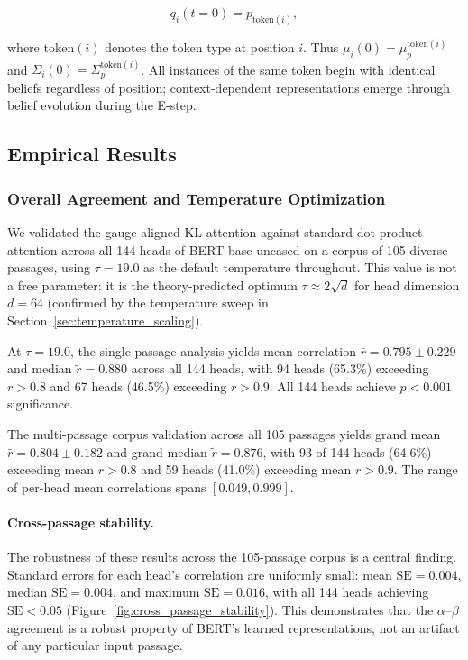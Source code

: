 \documentclass[twoside,11pt]{article}
\begin{document}
\begin{equation}
q_i(t=0) = p_{\text{token}(i)},
\end{equation}

where $\text{token}(i)$ denotes the token type at position $i$. Thus $\mu_i(0) = \mu_p^{\text{token}(i)}$ and $\Sigma_i(0) = \Sigma_p^{\text{token}(i)}$. All instances of the same token begin with identical beliefs regardless of position; context-dependent representations emerge through belief evolution during the E-step.

\subsection{Empirical Results}

\subsubsection{Overall Agreement and Temperature Optimization}

We validated the gauge-aligned KL attention against standard dot-product attention across all 144 heads of BERT-base-uncased on a corpus of 105 diverse passages, using $\tau = 19.0$ as the default temperature throughout. This value is not a free parameter: it is the theory-predicted optimum $\tau \approx 2\sqrt{d}$ for head dimension $d = 64$ (confirmed by the temperature sweep in Section~\ref{sec:temperature_scaling}).

At $\tau = 19.0$, the single-passage analysis yields mean correlation $\bar{r} = 0.795 \pm 0.229$ and median $\tilde{r} = 0.880$ across all 144 heads, with 94 heads (65.3\%) exceeding $r > 0.8$ and 67 heads (46.5\%) exceeding $r > 0.9$. All 144 heads achieve $p < 0.001$ significance.

The multi-passage corpus validation across all 105 passages yields grand mean $\bar{r} = 0.804 \pm 0.182$ and grand median $\tilde{r} = 0.876$, with 93 of 144 heads (64.6\%) exceeding mean $r > 0.8$ and 59 heads (41.0\%) exceeding mean $r > 0.9$. The range of per-head mean correlations spans $[0.049, 0.999]$.

\paragraph{Cross-passage stability.} The robustness of these results across the 105-passage corpus is a central finding. Standard errors for each head's correlation are uniformly small: mean $\mathrm{SE} = 0.004$, median $\mathrm{SE} = 0.004$, and maximum $\mathrm{SE} = 0.016$, with all 144 heads achieving $\mathrm{SE} < 0.05$ (Figure~\ref{fig:cross_passage_stability}). This demonstrates that the $\alpha$--$\beta$ agreement is a robust property of BERT's learned representations, not an artifact of any particular input passage.
\end{document}
